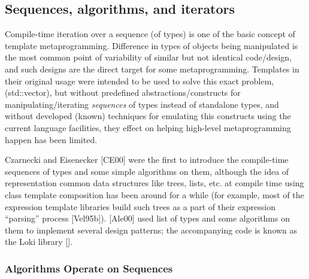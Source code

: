 \documentclass{kapproc}
\newcommand{\Mpl}{Boost Meta\-pro\-gram\-ming Library}
\begin{document}
\subsection{Sequences, algorithms, and iterators}

Compile-time iteration over a sequence (of types) is one of 
the basic concept of template metaprogramming. Difference in 
types of objects being manipulated is the most common point 
of variability of similar but not identical code/design, and 
such designs are the direct target for some metaprogramming. 
Templates in their original usage were intended to be used to 
solve this exact problem, (std::vector), but without predefined 
abstractions/constructs for manipulating/iterating 
\emph{sequences} of types instead of standalone types, and 
without developed (known) techniques for emulating this 
constructs using the current language facilities, they effect 
on helping high-level metaprogramming happen has been limited. 

Czarnecki and Eisenecker [CE00] were the first to introduce 
the compile-time sequences of types and some simple algorithms 
on them, although the idea of representation common data 
structures like trees, lists, etc. at compile time using class 
template composition has been around for a while (for example, 
most of the expression template libraries build such trees as 
a part of their expression ``parsing'' process [Vel95b]). 
[Ale00] used list of types and some algorithms on them to 
implement several design patterns; the accompanying code 
is known as the Loki library []. 



\subsubsection{Algorithms Operate on Sequences}
  
\end{document}

